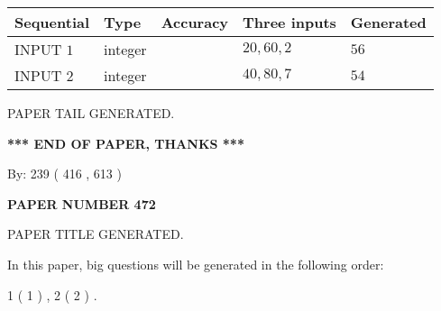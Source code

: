 \documentclass{ctexart}
\begin{document}
   
  
  
\noindent\begin{tabular}{|l|l|l|l|l|}
\hline
 Sequential & Type & Accuracy & Three inputs & Generated \\ 
\hline
 
 
  INPUT $  1 $ & integer &  & $
 20
 , 
 60
 , 
 2
 $ & $ 56 $ 
 \\  \hline  
 
 
  INPUT $  2 $ & integer &  & $
 40
 , 
 80
 , 
 7
 $ & $ 54 $ 
 \\  \hline  
 \end{tabular}
   
   
   
   
   
   
 \vspace{0.2in}
 
   
   
\vspace{2.0in} PAPER TAIL GENERATED.
   
   
   
   
\vspace{1.0in} 
{\textbf{\large{ *** END OF PAPER, THANKS *** }}} 
   
   
\hspace{1.0in} By: 
 239 ( 416 ,  613 )
   
   
   
   
\newpage 
\setcounter{page}{ 
   472001 } 
   
   
   
   
 {\textbf{ \Large{ PAPER NUMBER  472  }}}
   
   
\vspace{0.2in}
   
   
   
   
   
   
   
   
 \vspace{0.2in}
 
 
 
 
   
   
 PAPER TITLE GENERATED.
   
   
   
\vspace{0.2in}
   
In this paper, big questions will be generated in the following order: 
   
   
   1 ( 1 )
 ,
   2 ( 2 )
 .
  
\end{document}
